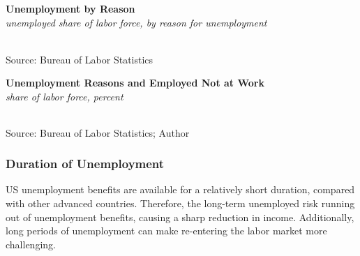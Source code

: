 \documentclass{report}
\makeatletter
\newcommand{\tbllink}[1]{\href{https://raw.githubusercontent.com/bdecon/US-chartbook/master/chartbook/data/#1}{\faTable}}
\newcommand*\short[1]{\expandafter\@gobbletwo\number\numexpr#1\relax}
\newcommand{\ctsbar}[5]{
		\addplot[ybar stacked, bar width=#5, draw opacity=0, fill=#1] 
			table [x=#2, y=#3, col sep=comma]{#4};}
\newcommand{\dateaxisticks}{
		date coordinates in=x, axis line style={draw=none},
		xmax={2022-03-15},
		max space between ticks=40,	    
		xtick={{1990-01-01}, {1992-01-01}, {1994-01-01}, 
			{1996-01-01}, {1998-01-01}, {2000-01-01}, 
			{2002-01-01}, {2004-01-01}, {2006-01-01},
			{2008-01-01}, {2010-01-01}, {2012-01-01}, {2014-01-01},
		    {2016-01-01}, {2018-01-01}, {2020-01-01}, {2022-01-01}, 
		    {2024-01-01}, {2026-01-01}},
		minor xtick={{1989-01-01}, {1991-01-01}, {1993-01-01},
			{1995-01-01}, {1997-01-01}, {1999-01-01}, 
			{2001-01-01}, {2003-01-01}, {2005-01-01}, {2007-01-01},
		    {2009-01-01}, {2011-01-01}, {2013-01-01}, {2015-01-01},
		    {2017-01-01}, {2019-01-01}, {2021-01-01}, {2023-01-01}, 
		    {2025-01-01}, {2027-01-01}},
		enlarge y limits={0.06}, enlarge x limits={0.01},
		}
\newcommand{\bbar}[2]{extra #1 ticks = {{#2}}, extra #1 tick labels = ,
		extra #1 tick style = {grid=major, grid style={thick, black!25}},}
\newcommand{\rbars}{
		\fill[color=black!10] (axis cs:{1990-07-01},\pgfkeysvalueof{/pgfplots/ymin}) rectangle 
			(axis cs:{1991-03-01}, \pgfkeysvalueof{/pgfplots/ymax});
		\fill[color=black!10] (axis cs:{2007-12-01},\pgfkeysvalueof{/pgfplots/ymin}) rectangle 
			(axis cs:{2009-07-01}, \pgfkeysvalueof{/pgfplots/ymax});
		\fill[color=black!10] (axis cs:{2001-03-01},\pgfkeysvalueof{/pgfplots/ymin}) rectangle 
			(axis cs:{2001-11-01}, \pgfkeysvalueof{/pgfplots/ymax});
		\fill[color=black!10] (axis cs:{2020-02-01},\pgfkeysvalueof{/pgfplots/ymin}) rectangle 
			(axis cs:{2020-05-01}, \pgfkeysvalueof{/pgfplots/ymax});}
\makeatother
\begin{document}
{{\begin{minipage}{0.99\textwidth} 
\normalsize \textbf{Unemployment by Reason}\\
\footnotesize{\textit{unemployed share of labor force, by reason for unemployment}}\\
\hspace*{-2mm} \\
\footnotesize{Source: Bureau of Labor Statistics} \hfill \tbllink{unemp_reason.csv}
\vspace{2mm}

\normalsize \textbf{Unemployment Reasons and Employed Not at Work}\\
\footnotesize{\textit{share of labor force, percent}}\\
 \setlength{\tabcolsep}{3.1pt} \color{black!90}
	{\renewcommand{\arraystretch}{1.55}
		\begin{tabular}{p{31mm} R{6.7mm} R{6.7mm} R{6.7mm} R{6.7mm} R{6.7mm} R{6.7mm} 
		   R{6.7mm} R{6.7mm} R{6.7mm} R{6.7mm} R{6.7mm}}
			  \hline
		\end{tabular}}\vspace{-2mm}
		
\footnotesize{Source: Bureau of Labor Statistics; Author}
\end{minipage}
\newpage
\begin{minipage}{0.76\textwidth} 
\subsubsection*{Duration of Unemployment}
\small US unemployment benefits are available for a relatively short duration, compared with other advanced countries. Therefore, the long-term unemployed risk running out of unemployment benefits, causing a sharp reduction in income. Additionally, long periods of unemployment can make re-entering the labor market more challenging. 


\end{minipage}}}
\end{document}
